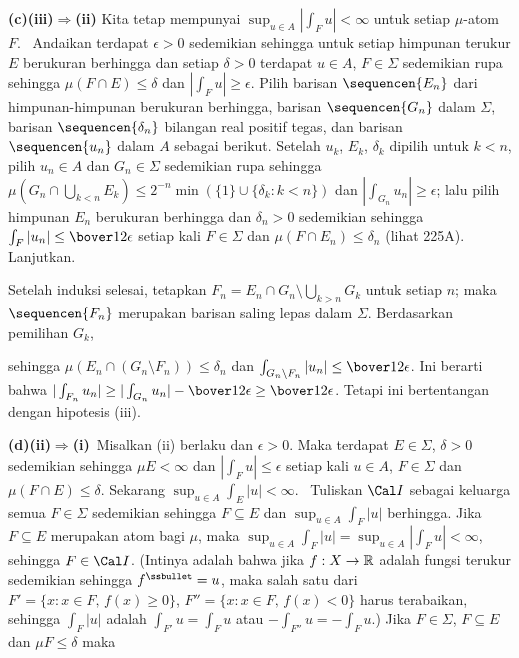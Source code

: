 {\medskip

{\bf (c)(iii)$\Rightarrow$(ii)} Kita tetap mempunyai $\sup_{u\in
A}|\int_Fu|<\infty$ untuk setiap $\mu$-atom $F$. \Quer\ Andaikan terdapat
$\epsilon>0$ sedemikian sehingga untuk setiap
himpunan terukur $E$ berukuran berhingga dan setiap $\delta>0$ terdapat
$u\in A$,
$F\in\Sigma$ sedemikian rupa sehingga $\mu(F\cap E)\le\delta$ dan
$|\int_Fu|\ge\epsilon$. Pilih barisan $\sequencen{E_n}$ dari
himpunan-himpunan berukuran berhingga, barisan $\sequencen{G_n}$ dalam
$\Sigma$, barisan $\sequencen{\delta_n}$ bilangan real positif tegas, dan
barisan $\sequencen{u_n}$ dalam $A$ sebagai berikut.
Setelah $u_k$, $E_k$, $\delta_k$ dipilih untuk $k<n$, pilih $u_n\in A$ dan
$G_n\in\Sigma$ sedemikian rupa sehingga $\mu(G_n\cap\bigcup_{k<n}E_k)\le
2^{-n}\min(\{1\}\cup\{\delta_k:k<n\})$ dan $|\int_{G_n}u_n|\ge\epsilon$;
lalu pilih himpunan $E_n$ berukuran berhingga dan $\delta_n>0$
sedemikian sehingga $\int_F|u_n|\le\bover12\epsilon$ setiap kali $F\in\Sigma$
dan $\mu(F\cap E_n)\le\delta_n$ (lihat 225A). Lanjutkan.

Setelah induksi selesai, tetapkan $F_n=E_n\cap
G_n\setminus\bigcup_{k>n}G_k$ untuk setiap $n$; maka $\sequencen{F_n}$
merupakan barisan saling lepas dalam $\Sigma$. Berdasarkan pemilihan $G_k$,


\noindent sehingga $\mu(E_n\cap(G_n\setminus F_n))\le\delta_n$ dan
$\int_{G_n\setminus F_n}|u_n|\le \bover12\epsilon$. Ini berarti bahwa
$|\int_{F_n}u_n|\ge|\int_{G_n}u_n|-\bover12\epsilon\ge\bover12\epsilon$.
Tetapi ini bertentangan dengan hipotesis (iii). \Bang

\medskip

{\bf (d)(ii)$\Rightarrow$(i)}\grheada\ Misalkan (ii) berlaku dan $\epsilon>0$.
Maka terdapat $E\in\Sigma$, $\delta>0$ sedemikian sehingga $\mu E<\infty$ dan
$|\int_Fu|\le\epsilon$ setiap kali $u\in A$, $F\in\Sigma$ dan $\mu(F\cap
E)\le\delta$. Sekarang $\sup_{u\in A}\int_E|u|<\infty$. \Prf\
 Tuliskan $\Cal I$ sebagai keluarga semua $F\in\Sigma$ sedemikian sehingga
$F\subseteq E$ dan $\sup_{u\in A}\int_F|u|$ berhingga. Jika $F\subseteq E$
merupakan atom bagi $\mu$, maka
$\sup_{u\in A}\int_F|u|=\sup_{u\in A}|\int_Fu|<\infty$,
sehingga $F\in\Cal I$. (Intinya adalah bahwa jika $f:X\to\Bbb R$ adalah fungsi
terukur sedemikian sehingga $f^{\ssbullet}=u$, maka salah satu dari
$F'=\{x:x\in F,\,f(x)\ge 0\}$, $F''=\{x:x\in F,\,f(x)<0\}$ harus terabaikan,
sehingga $\int_F|u|$ adalah $\int_{F'}u=\int_Fu$ atau
$-\int_{F''}u=-\int_Fu$.) Jika $F\in\Sigma$, $F\subseteq E$ dan $\mu
F\le\delta$ maka

}
